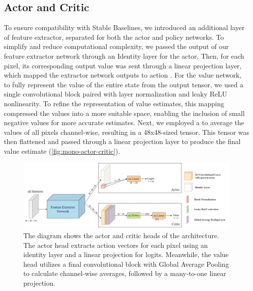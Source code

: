 \subsection{Actor and Critic}
\label{sec:mono-network-actor-critic}

\noindent To ensure compatibility with Stable Baselines, we introduced an additional layer of feature extractor, separated for both the actor and policy networks. To simplify and reduce computational complexity, we passed the output of our feature extractor network through an Identity layer for the actor. Then, for each pixel, its corresponding output value was sent through a linear projection layer, which mapped the extractor network outputs to action . For the value network, to fully represent the value of the entire state from the output tensor, we used a single convolutional block paired with layer normalization and leaky ReLU nonlinearity. To refine the representation of value estimates, this mapping compressed the values into a more suitable space, enabling the inclusion of small negative values for more accurate estimates. Next, we employed a  \cite{lin2014network} to average the values of all pixels channel-wise, resulting in a 48x48-sized tensor. This tensor was then flattened and passed through a linear projection layer to produce the final value estimate (\autoref{fig:mono-actor-critic}).

\begin{figure}[htbp]
    \centering
    \includegraphics[width=1\linewidth]{images/methods_mono/actor_critic/actor-critic-head.png}
    \captionsetup{justification=justified, singlelinecheck=false, width=1\linewidth, labelfont=bf} 
    \caption[]{The diagram shows the actor and critic heads of the architecture. The actor head extracts action vectors for each pixel using an identity layer and a linear projection for logits. Meanwhile, the value head utilizes a final convolutional block with Global Average Pooling to calculate channel-wise averages, followed by a many-to-one linear projection.}
    \label{fig:mono-actor-critic}
\end{figure}

